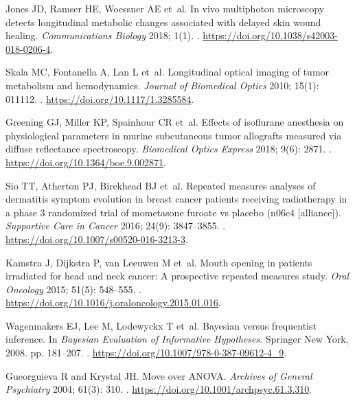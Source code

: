 \documentclass[Royal,times,doublespace,sagev]{sagej}
\begin{document}
\begin{thebibliography}{10}
Jones JD, Ramser HE, Woessner AE et~al.
\newblock In vivo multiphoton microscopy detects longitudinal metabolic changes
  associated with delayed skin wound healing.
\newblock \emph{Communications Biology} 2018; 1(1).
\newblock {}.
\newblock \urlprefix\url{https://doi.org/10.1038/s42003-018-0206-4}.

Skala MC, Fontanella A, Lan L et~al.
\newblock Longitudinal optical imaging of tumor metabolism and hemodynamics.
\newblock \emph{Journal of Biomedical Optics} 2010; 15(1): 011112.
\newblock {}.
\newblock \urlprefix\url{https://doi.org/10.1117/1.3285584}.

Greening GJ, Miller KP, Spainhour CR et~al.
\newblock Effects of isoflurane anesthesia on physiological parameters in
  murine subcutaneous tumor allografts measured via diffuse reflectance
  spectroscopy.
\newblock \emph{Biomedical Optics Express} 2018; 9(6): 2871.
\newblock {}.
\newblock \urlprefix\url{https://doi.org/10.1364/boe.9.002871}.

Sio TT, Atherton PJ, Birckhead BJ et~al.
\newblock Repeated measures analyses of dermatitis symptom evolution in breast
  cancer patients receiving radiotherapy in a phase 3 randomized trial of
  mometasone furoate vs placebo (n06c4 [alliance]).
\newblock \emph{Supportive Care in Cancer} 2016; 24(9): 3847--3855.
\newblock {}.
\newblock \urlprefix\url{https://doi.org/10.1007/s00520-016-3213-3}.

Kamstra J, Dijkstra P, van Leeuwen M et~al.
\newblock Mouth opening in patients irradiated for head and neck cancer: A
  prospective repeated measures study.
\newblock \emph{Oral Oncology} 2015; 51(5): 548--555.
\newblock {}.
\newblock \urlprefix\url{https://doi.org/10.1016/j.oraloncology.2015.01.016}.

Wagenmakers EJ, Lee M, Lodewyckx T et~al.
\newblock Bayesian versus frequentist inference.
\newblock In \emph{Bayesian Evaluation of Informative Hypotheses}. Springer New
  York, 2008.
\newblock pp. 181--207.
\newblock {}.
\newblock \urlprefix\url{https://doi.org/10.1007/978-0-387-09612-4_9}.

Gueorguieva R and Krystal JH.
\newblock Move over {ANOVA}.
\newblock \emph{Archives of General Psychiatry} 2004; 61(3): 310.
\newblock {}.
\newblock \urlprefix\url{https://doi.org/10.1001/archpsyc.61.3.310}.


\end{thebibliography}
\end{document}
